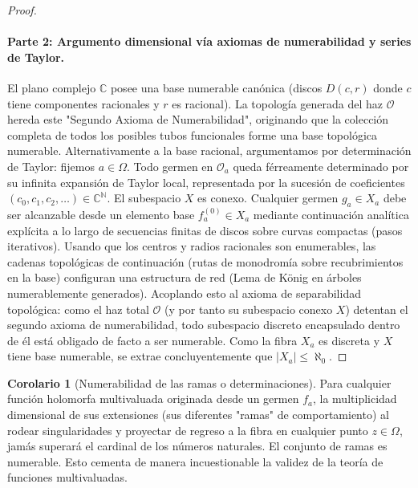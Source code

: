 \documentclass[11pt,a4paper]{article}
\theoremstyle{definition}
\newtheorem{corolario}{Corolario}[section]
\theoremstyle{remark}
\numberwithin{equation}{section}
\begin{document}
\begin{proof}
\paragraph{Parte 2: Argumento dimensional vía axiomas de numerabilidad y series de Taylor.} El plano complejo $\mathbb{C}$ posee una base numerable canónica (discos $D(c, r)$ donde $c$ tiene componentes racionales y $r$ es racional). La topología generada del haz $\mathcal{O}$ hereda este "Segundo Axioma de Numerabilidad", originando que la colección completa de todos los posibles tubos funcionales forme una base topológica numerable.
Alternativamente a la base racional, argumentamos por determinación de Taylor: fijemos $a \in \Omega$. Todo germen en $\mathcal{O}_a$ queda férreamente determinado por su infinita expansión de Taylor local, representada por la sucesión de coeficientes $(c_0, c_1, c_2, \dots) \in \mathbb{C}^\mathbb{N}$. 
El subespacio $X$ es conexo. Cualquier germen $g_a \in X_a$ debe ser alcanzable desde un elemento base $f_a^{(0)} \in X_a$ mediante continuación analítica explícita a lo largo de secuencias finitas de discos sobre curvas compactas (pasos iterativos). Usando que los centros y radios racionales son enumerables, las cadenas topológicas de continuación (rutas de monodromía sobre recubrimientos en la base) configuran una estructura de red (Lema de König en árboles numerablemente generados). 
Acoplando esto al axioma de separabilidad topológica: como el haz total $\mathcal{O}$ (y por tanto su subespacio conexo $X$) detentan el segundo axioma de numerabilidad, todo subespacio discreto encapsulado dentro de él está obligado de facto a ser numerable. Como la fibra $X_a$ es discreta y $X$ tiene base numerable, se extrae concluyentemente que $|X_a| \le \aleph_0$.
\end{proof}

\begin{corolario}[Numerabilidad de las ramas o determinaciones]
Para cualquier función holomorfa multivaluada originada desde un germen $f_a$, la multiplicidad dimensional de sus extensiones (sus diferentes "ramas" de comportamiento) al rodear singularidades y proyectar de regreso a la fibra en cualquier punto $z \in \Omega$, jamás superará el cardinal de los números naturales. El conjunto de ramas es numerable. 
Esto cementa de manera incuestionable la validez de la teoría de funciones multivaluadas.
\end{corolario}
\end{document}
